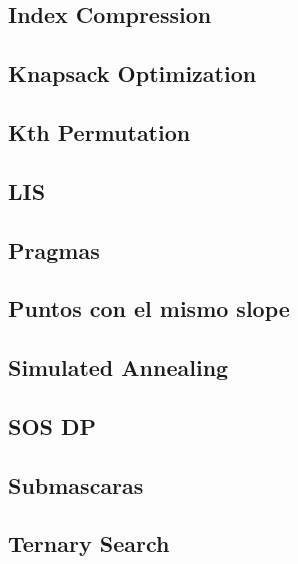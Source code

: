 \subsection{	Index Compression}
\raggedbottom
\hrulefill
\subsection{	Knapsack Optimization}
\raggedbottom
\hrulefill
\subsection{	Kth Permutation}
\raggedbottom
\hrulefill
\subsection{	LIS}
\raggedbottom
\hrulefill
\subsection{	Pragmas}
\raggedbottom
\hrulefill
\subsection{	Puntos con el mismo slope}
\raggedbottom
\hrulefill
\subsection{	Simulated Annealing}
\raggedbottom
\hrulefill
\subsection{	SOS DP}
\raggedbottom
\hrulefill
\subsection{	Submascaras}
\raggedbottom
\hrulefill
\subsection{	Ternary Search}
\raggedbottom
\hrulefill

